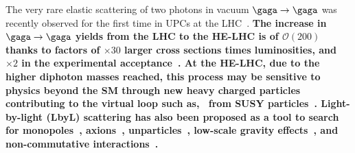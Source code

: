 \documentclass[../report.tex]{subfiles}
\begin{document}
The very rare elastic scattering of two photons in vacuum
$\gaga\to\gaga$  was recently
observed for the first time in UPCs at the LHC~\cite{Aaboud:2017bwk,CMS-PAS-FSQ-16-012}.
{\bf The increase in $\gaga\to\gaga$ yields from the LHC to the HE-LHC is of $\mathcal{O}(200)$ thanks to factors
of $\times 30$ larger cross sections times luminosities, and $\times 2$ in the experimental acceptance~\cite{dEnterria:2013yra,dEnterria:2016ztx}. 
At the HE-LHC, due to the higher diphoton masses
reached, this process may be sensitive to physics beyond the SM through new heavy charged particles contributing to the
virtual loop such as, \eg\ from SUSY
particles~\cite{Gounaris:1999gh}. Light-by-light (LbyL) scattering has also been proposed as a tool to
search for monopoles~\cite{Ginzburg:1998vb}, axions~\cite{Bernard:1997kj}, unparticles~\cite{Kikuchi:2008pr}, 
low-scale gravity effects~\cite{Cheung:1999ja}, and non-commutative interactions~\cite{Hewett:2000zp}.}







 
\end{document}
